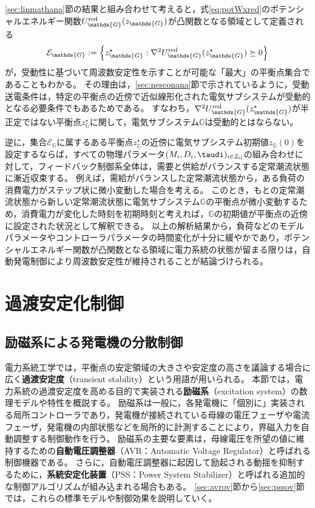 \documentclass[tombow,dvipdfmx]{corona-a5-1.1}
\begin{document}
\ref{sec:linmathana}節の結果と組み合わせて考えると，式\ref{eq:potWxred}のポテンシャルエネルギー関数$U_{\mathds{G}}^{\rm red} (z_{\mathds{G}})$が凸関数となる領域として定義される
\[
\mathcal{E}_{\mathds{G}}:=
\left\{
z_{\mathds{G}}^{\star} : \nabla^2 U_{\mathds{G}}^{\rm red} (z_{\mathds{G}}^{\star}) 
\succeq 0
\right\}
\]
が，受動性に基づいて周波数安定性を示すことが可能な「最大」の平衡点集合であることもわかる。
その理由は，\ref{sec:nesconana}節で示されているように，受動送電条件は，特定の平衡点の近傍で近似線形化された電気サブシステムが受動的となる必要条件でもあるためである。
すなわち，$\nabla^2 U_{\mathds{G}}^{\rm red} (z_{\mathds{G}}^{\star}) $が半正定ではない平衡点$z_{\mathds{G}}^{\star}$に関して，電気サブシステム$\mathds{G}$は受動的とはならない。

逆に，集合$\mathcal{E}_{\mathds{G}}$に属するある平衡点$z_{\mathds{G}}^{\star}$の近傍に電気サブシステム初期値$z_{\mathds{G}}(0)$を設定するならば，すべての物理パラメータ$(M_i,D_i,\taudi)_{i \in \mathcal{I}_{\rm G}}$の組み合わせに対して，フィードバック制御系全体は，需要と供給がバランスする定常潮流状態に漸近収束する。
例えば，需給がバランスした定常潮流状態から，ある負荷の消費電力がステップ状に微小変動した場合を考える。
このとき，もとの定常潮流状態から新しい定常潮流状態に電気サブシステム$\mathds{G}$の平衡点が微小変動するため，消費電力が変化した時刻を初期時刻と考えれば，$\mathds{G}$の初期値が平衡点の近傍に設定された状況として解釈できる。
以上の解析結果から，負荷などのモデルパラメータやコントローラパラメータの時間変化が十分に緩やかであり，ポテンシャルエネルギー関数が凸関数となる領域に電力系統の状態が留まる限りは，自動発電制御により周波数安定性が維持されることが結論づけられる。


\section{過渡安定化制御}\label{sec:transcont}

\subsection{励磁系による発電機の分散制御}

電力系統工学では，平衡点の安定領域の大きさや安定度の高さを議論する場合に広く\textbf{過渡安定度}（transient stability）という用語が用いられる。
本節では，電力系統の過渡安定度を高める目的で実装される\textbf{励磁系}（excitation system）の数理モデルや特性を概説する。
励磁系は一般に，各発電機に「個別に」実装される局所コントローラであり，発電機が接続されている母線の電圧フェーザや電流フェーザ，発電機の内部状態などを局所的に計測することにより，界磁入力を自動調整する制御動作を行う。
励磁系の主要な要素は，母線電圧を所望の値に維持するための\textbf{自動電圧調整器}（AVR：Automatic Voltage Regulator）と呼ばれる制御機器である。
さらに，自動電圧調整器に起因して励起される動揺を抑制するために，\textbf{系統安定化装置}（PSS：Power System Stabilizer）と呼ばれる追加的な制御アルゴリズムが組み込まれる場合もある。
\ref{sec:avrov}節から\ref{sec:pssov}節では，これらの標準モデルや制御効果を説明していく。
\end{document}
